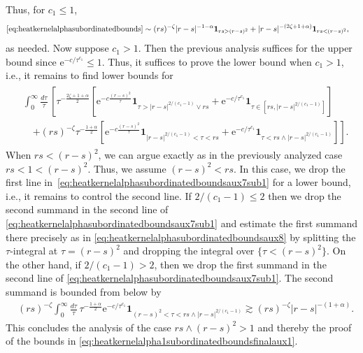 \documentclass[12pt,reqno,a4paper]{amsart}
\theoremstyle{definition}
\theoremstyle{remark}
\numberwithin{equation}{section}
\newcommand{\1}{\mathbbm{1}}
\newcommand{\me}[1]{\mathrm{e}^{#1}}
\newcommand{\one}{\mathbf{1}}
\begin{document}
Thus, for $c_1\leq1$,
\begin{align}
  \begin{split}
    \eqref{eq:heatkernelalphasubordinatedbounds}
    & \sim (rs)^{-\zeta}|r-s|^{-1-\alpha}\one_{rs>(r-s)^2} + |r-s|^{-(2\zeta+1+\alpha)}\one_{rs<(r-s)^2},
  \end{split}
\end{align}
as needed. Now suppose $c_1>1$. Then the previous analysis suffices for the upper bound since $\me{-c/\tau^{c_1}}\leq1$. Thus, it suffices to prove the lower bound when $c_1>1$, i.e., it remains to find lower bounds for
\begin{align}
  \label{eq:heatkernelalphasubordinatedboundsaux7sub1}
  \begin{split}
    & \int_0^\infty \frac{d\tau}{\tau}\, \left[ \tau^{-\frac{2\zeta+1+\alpha}{2}} \left[\me{-c\frac{(r-s)^2}{\tau}}\one_{\tau>|r-s|^{2/(c_1-1)}\vee rs} + \me{-c/\tau^{c_1}}\one_{\tau\in[rs,|r-s|^{2/(c_1-1)}]}\right] \right. \\
    & \quad \left. + (rs)^{-\zeta} \tau^{-\frac{1+\alpha}{2}}\left[\me{-c\frac{(r-s)^2}{\tau}}\one_{|r-s|^{2/(c_1-1)}<\tau<rs} + \me{-c/\tau^{c_1}}\one_{\tau<rs\wedge |r-s|^{2/(c_1-1)}}\right]\right].
  \end{split}
\end{align}
When $rs<(r-s)^2$, we can argue exactly as in the previously analyzed case $rs<1<(r-s)^2$. Thus, we assume $(r-s)^2<rs$. In this case, we drop the first line in~\eqref{eq:heatkernelalphasubordinatedboundsaux7sub1} for a lower bound, i.e., it remains to control the second line. If $2/(c_1-1)\leq2$ then we drop the second summand in the second line of \eqref{eq:heatkernelalphasubordinatedboundsaux7sub1} and estimate the first summand there precisely as in \eqref{eq:heatkernelalphasubordinatedboundsaux8} by splitting the $\tau$-integral at $\tau=(r-s)^2$ and dropping the integral over $\{\tau<(r-s)^2\}$. On the other hand, if $2/(c_1-1)>2$, then we drop the first summand in the second line of \eqref{eq:heatkernelalphasubordinatedboundsaux7sub1}. The second summand is bounded from below by
\begin{align}
  & (rs)^{-\zeta} \int_0^\infty \frac{d\tau}{\tau}\, \tau^{-\frac{1+\alpha}{2}} \me{-c/\tau^{c_1}}\one_{(r-s)^2<\tau<rs\wedge |r-s|^{2/(c_1-1)}}
    \gtrsim (rs)^{-\zeta} |r-s|^{-(1+\alpha)}.
\end{align}
This concludes the analysis of the case $rs\wedge(r-s)^2>1$ and thereby the proof of the bounds in \eqref{eq:heatkernelalpha1subordinatedboundsfinalaux1}.
\end{document}
